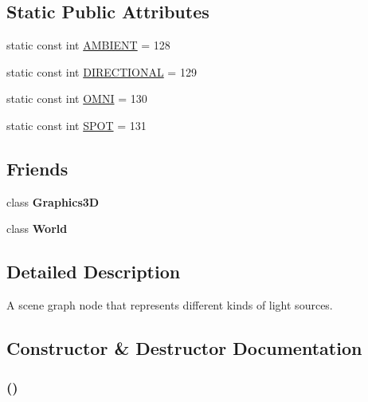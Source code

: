 \subsection*{Static Public Attributes}
\begin{CompactItemize}
\item 
static const int \hyperlink{classm3g_1_1Light_4cf648a82d9de62a1fb15f4277049594}{AMBIENT} = 128
\item 
static const int \hyperlink{classm3g_1_1Light_a2fb668ca8bbeb8323eda98fba594fda}{DIRECTIONAL} = 129
\item 
static const int \hyperlink{classm3g_1_1Light_34d360bb8395ad7fbcd3ec286ece64cb}{OMNI} = 130
\item 
static const int \hyperlink{classm3g_1_1Light_c44aef16b96dc8fd8b134416964a7de9}{SPOT} = 131
\end{CompactItemize}
\subsection*{Friends}
\begin{CompactItemize}
\item 
\hypertarget{classm3g_1_1Light_8174d4c629550c1ee279571250236ef4}{
class \textbf{Graphics3D}}
\label{classm3g_1_1Light_8174d4c629550c1ee279571250236ef4}

\item 
\hypertarget{classm3g_1_1Light_7b4bcdf992c21ae83363f25df05b1d25}{
class \textbf{World}}
\label{classm3g_1_1Light_7b4bcdf992c21ae83363f25df05b1d25}

\end{CompactItemize}


\subsection{Detailed Description}
A scene graph node that represents different kinds of light sources. 

\subsection{Constructor \& Destructor Documentation}
\hypertarget{classm3g_1_1Light_7f8a7be05225f470c200f7e4ff914a3c}{
\subsubsection[{Light}]{ ()}}
\label{classm3g_1_1Light_7f8a7be05225f470c200f7e4ff914a3c}



